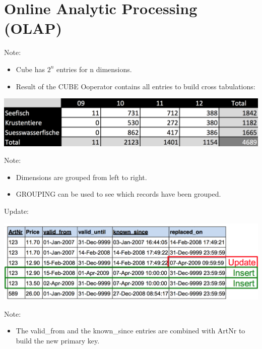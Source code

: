 
\section{Online Analytic Processing (OLAP)}


\begin{breakbox}
Note:
\begin{itemize}
	\item Cube has $2^n$ entries for n dimensions.
	\item Result of the CUBE Ooperator contains all entries to build cross tabulations:
\end{itemize}
\begin{center}
\includegraphics[width=.15\textwidth]{slides_images/cross_tabulation}
\end{center}
\end{breakbox}

\begin{breakbox}
Note:
\begin{itemize}
	\item Dimensions are grouped from left to right.
	\item GROUPING can be used to see which records have been grouped.
\end{itemize}
\end{breakbox}

\begin{breakbox}
\newline Update:
\begin{center}
\includegraphics[width=.15\textwidth]{slides_images/bi_temporal_update}
\end{center}
Note:
\begin{itemize}
	\item The valid\_from and the known\_since entries are combined with ArtNr to build the new primary key.
\end{itemize}
\end{breakbox}

